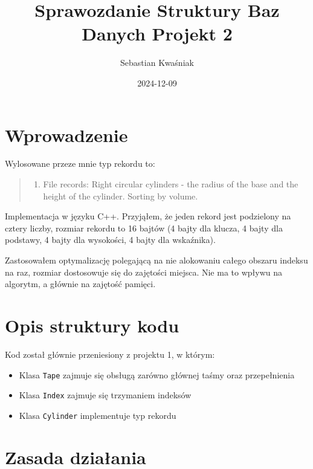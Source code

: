 \documentclass[
]{article}
\title{Sprawozdanie Struktury Baz Danych Projekt 2}
\author{Sebastian Kwaśniak}
\date{2024-12-09}
\providecommand{\tightlist}{%
  \setlength{\itemsep}{0pt}\setlength{\parskip}{0pt}}
\begin{document}
\maketitle

\renewcommand{\figurename}{Rys.}

\section{Wprowadzenie}\label{wprowadzenie}

Wylosowane przeze mnie typ rekordu to:

\begin{quote}
\begin{enumerate}
\def\labelenumi{\arabic{enumi}.}
\setcounter{enumi}{28}
\tightlist
\item
  File records: Right circular cylinders - the radius of the base and
  the height of the cylinder. Sorting by volume.
\end{enumerate}
\end{quote}

Implementacja w języku C++. Przyjąłem, że jeden rekord jest podzielony
na cztery liczby, rozmiar rekordu to 16 bajtów (4 bajty dla klucza, 4
bajty dla podstawy, 4 bajty dla wysokości, 4 bajty dla wskaźnika).

Zastosowałem optymalizację polegającą na nie alokowaniu całego obszaru
indeksu na raz, rozmiar dostosowuje się do zajętości miejsca. Nie ma to
wpływu na algorytm, a głównie na zajętość pamięci.

\section{Opis struktury kodu}\label{opis-struktury-kodu}

Kod został głównie przeniesiony z projektu 1, w którym:

\begin{itemize}
\tightlist
\item
  Klasa \texttt{Tape} zajmuje się obsługą zarówno głównej taśmy oraz
  przepełnienia
\item
  Klasa \texttt{Index} zajmuje się trzymaniem indeksów
\item
  Klasa \texttt{Cylinder} implementuje typ rekordu
\end{itemize}

\section{Zasada działania}\label{zasada-dziaux142ania}
\end{document}
